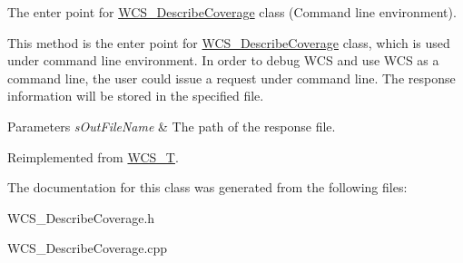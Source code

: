 The enter point for \hyperlink{classWCS__DescribeCoverage}{WCS\_\-DescribeCoverage} class (Command line environment). 

This method is the enter point for \hyperlink{classWCS__DescribeCoverage}{WCS\_\-DescribeCoverage} class, which is used under command line environment. In order to debug WCS and use WCS as a command line, the user could issue a request under command line. The response information will be stored in the specified file.


\begin{DoxyParams}{Parameters}
{\em sOutFileName} & The path of the response file. \\
\hline
\end{DoxyParams}


Reimplemented from \hyperlink{classWCS__T}{WCS\_\-T}.



The documentation for this class was generated from the following files:\begin{DoxyCompactItemize}
\item 
WCS\_\-DescribeCoverage.h\item 
WCS\_\-DescribeCoverage.cpp\end{DoxyCompactItemize}
